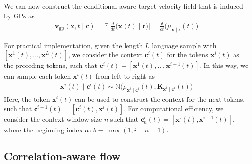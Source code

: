 \documentclass{article} %
\begin{document}
We can now construct the conditional-aware target velocity field that is induced by GPs as 
\begin{eqnarray}
    \mathbf{v}_{\text{gp}}(\mathbf{x}, t \mid \mathbf{c}) = \mathbb{E}\Big[\frac{d}{d t} \big( \mathbf{x}(t) \mid \mathbf{c} \big)\Big] = \frac{d}{dt} \big(\mu_{\mathbf{x}\mid \mathbf{c}}(t) \big) \label{eq:v_target}
\end{eqnarray}

For practical implementation, given the length $L$ language sample with $[\mathbf{x}^1(t), ..., \mathbf{x}^{L}(t)]$, we consider the context $\mathbf{c}^{i}(t)$ for the tokens $\mathbf{x}^{i}(t)$ as the preceding tokens, such that  $\mathbf{c}^i(t) = [\mathbf{x}^1(t), ..., \mathbf{x}^{i-1}(t)]$. In this way, we can sample each token $\mathbf{x}^{i}(t)$ from left to right as 
\begin{eqnarray}
    \mathbf{x}^i(t) \mid \mathbf{c}^i(t) \sim \mathbb{N}  \big(\mu_{\mathbf{x}^i\mid \mathbf{c}^i}(t), \bm{K}_{\mathbf{x}^i\mid \mathbf{c}^i} (t) \big)
\end{eqnarray}
Here, the token $\mathbf{x}^i(t)$ can be used to construct the context for the next tokens, such that $\mathbf{c}^{i+1}(t) = [\mathbf{c}^{i}(t), \mathbf{x}^i(t)]$. For computational efficiency, we consider the context window size $n$ such that $\mathbf{c}_{n}^{i}(t) = [\mathbf{x}^{b}(t), \mathbf{x}^{i-1}(t)]$, where the beginning index as $b= \max (1, i-n-1)$. 




\subsection{Correlation-aware flow}
\label{sec:corr_flow}
\end{document}
